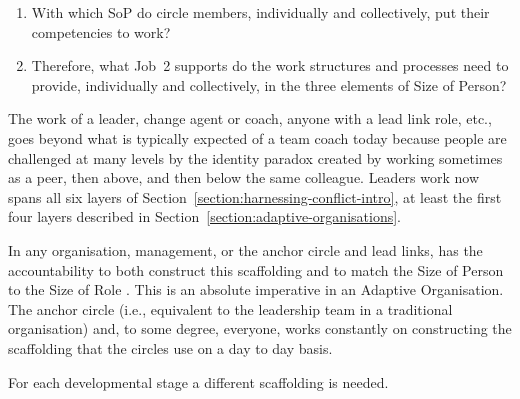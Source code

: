 \begin{enumerate}
\item With which SoP do circle members, individually and collectively, put their competencies to work?
\item Therefore, what Job~2 supports do the work structures and processes need to provide, individually and collectively, in the three elements of Size of Person?
\end{enumerate}


The work of a leader, change agent or coach, anyone with a lead link role, etc., goes beyond what is typically expected of a team coach today because people are challenged at many levels by the identity paradox created by working sometimes as a peer, then above, and then below the same colleague. Leaders work now spans all six layers of Section~\ref{section:harnessing-conflict-intro}, at least the first four layers described in Section~\ref{section:adaptive-organisations}. 


In any organisation, management, or the anchor circle and lead links, has the accountability to both construct this scaffolding and to match the Size of Person to the Size of Role . This is an absolute imperative in an Adaptive Organisation. The anchor circle (i.e., equivalent to the leadership team in a traditional organisation) and, to some degree, everyone, works constantly on constructing the scaffolding that the circles use on a day to day basis.


For each developmental stage a different scaffolding  is needed. 


